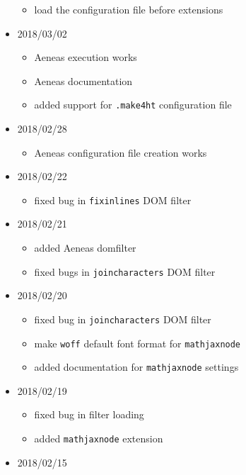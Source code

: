 \begin{itemize}
  \begin{itemize}
  \tightlist
  \item
    load the configuration file before extensions
  \end{itemize}
\item
  2018/03/02

  \begin{itemize}
  \tightlist
  \item
    Aeneas execution works
  \item
    Aeneas documentation
  \item
    added support for \texttt{.make4ht} configuration file
  \end{itemize}
\item
  2018/02/28

  \begin{itemize}
  \tightlist
  \item
    Aeneas configuration file creation works
  \end{itemize}
\item
  2018/02/22

  \begin{itemize}
  \tightlist
  \item
    fixed bug in \texttt{fixinlines} DOM filter
  \end{itemize}
\item
  2018/02/21

  \begin{itemize}
  \tightlist
  \item
    added Aeneas domfilter
  \item
    fixed bugs in \texttt{joincharacters} DOM filter
  \end{itemize}
\item
  2018/02/20

  \begin{itemize}
  \tightlist
  \item
    fixed bug in \texttt{joincharacters} DOM filter
  \item
    make \texttt{woff} default font format for \texttt{mathjaxnode}
  \item
    added documentation for \texttt{mathjaxnode} settings
  \end{itemize}
\item
  2018/02/19

  \begin{itemize}
  \tightlist
  \item
    fixed bug in filter loading
  \item
    added \texttt{mathjaxnode} extension
  \end{itemize}
\item
  2018/02/15


\end{itemize}
